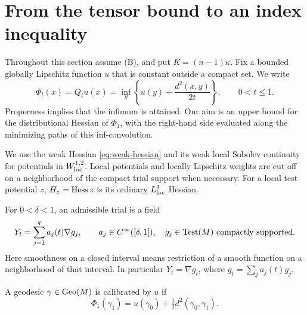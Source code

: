 \section{From the tensor bound to an index inequality}
\label{sec:heat-index}

Throughout this section assume \textup{(B)}, and put
\(K=(n-1)\kappa\). Fix a bounded globally Lipschitz function
\(u\) that is constant outside a compact set. We write
\[
\Phi_t(x)=Q_tu(x)
=\inf_y\left\{u(y)+\frac{d^2(x,y)}{2t}\right\},\qquad 0<t\le1.
\]
Properness implies that the infimum is attained. Our aim is an
upper bound for the distributional Hessian of \(\Phi_1\), with
the right-hand side evaluated along the minimizing paths of this
inf-convolution.

We use the weak Hessian \eqref{eq:weak-hessian} and its weak
local Sobolev continuity for potentials in \(W^{1,2}_{\rm loc}\).
Local potentials and locally Lipschitz weights are cut off on
a neighborhood of the compact trial support when necessary.
For a local test potential \(z\), \(H_z=\operatorname{Hess} z\) is its
ordinary \(L^2_{\rm loc}\) Hessian.

For \(0<\delta<1\), an admissible trial is a field
\begin{equation}
\label{heat:trial-class}
Y_t=\sum_{j=1}^q a_j(t)\nabla g_j,\qquad
a_j\in C^\infty([\delta,1]),\quad
g_j\in\operatorname{Test}(M)\text{ compactly supported}.
\end{equation}
Here smoothness on a closed interval means restriction of a
smooth function on a neighborhood of that interval. In
particular \(Y_t=\nabla g_t\), where
\(g_t=\sum_j a_j(t)g_j\).

A geodesic \(\gamma\in\operatorname{Geo}(M)\) is calibrated by \(u\) if
\begin{equation}
\label{heat:calibration}
\Phi_1(\gamma_1)
=u(\gamma_0)+\tfrac12d^2(\gamma_0,\gamma_1).
\end{equation}

